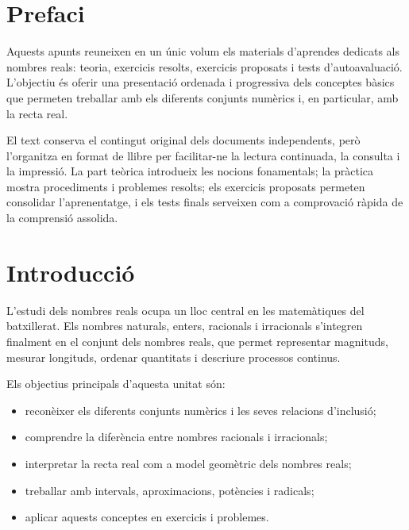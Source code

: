 \documentclass[12pt,a4paper,oneside]{book}
\begin{document}
	\pagecolor{fons!20}
	
	\frontmatter
	
	\title{}
	\author{Miquel Àngel Perelló}
	\date{\today}
	
	
	\maketitle
	\tableofcontents
	
	\let\cleardoublepage\clearpage


\chapter*{Prefaci}

Aquests apunts reuneixen en un únic volum els materials d’aprendes dedicats als nombres reals: teoria, exercicis resolts, exercicis proposats i tests d’autoavaluació. L’objectiu és oferir una presentació ordenada i progressiva dels conceptes bàsics que permeten treballar amb els diferents conjunts numèrics i, en particular, amb la recta real.

El text conserva el contingut original dels documents independents, però l’organitza en format de llibre per facilitar-ne la lectura continuada, la consulta i la impressió. La part teòrica introdueix les nocions fonamentals; la pràctica mostra procediments i problemes resolts; els exercicis proposats permeten consolidar l’aprenentatge, i els tests finals serveixen com a comprovació ràpida de la comprensió assolida.

\chapter*{Introducció}

L’estudi dels nombres reals ocupa un lloc central en les matemàtiques del batxillerat. Els nombres naturals, enters, racionals i irracionals s’integren finalment en el conjunt dels nombres reals, que permet representar magnituds, mesurar longituds, ordenar quantitats i descriure processos continus.

Els objectius principals d’aquesta unitat són:
\begin{itemize}
\item reconèixer els diferents conjunts numèrics i les seves relacions d’inclusió;
\item comprendre la diferència entre nombres racionals i irracionals;
\item interpretar la recta real com a model geomètric dels nombres reals;
\item treballar amb intervals, aproximacions, potències i radicals;
\item aplicar aquests conceptes en exercicis i problemes.
\end{itemize}
\end{document}
